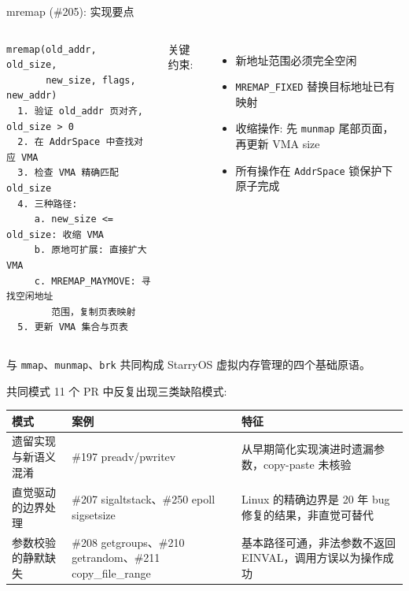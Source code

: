 \documentclass[aspectratio=169,10pt]{ctexbeamer}
\newcommand{\syscall}[1]{\texttt{#1}}
\begin{document}

\begin{frame}[fragile]{mremap (\#205): 实现要点}
\begin{columns}[T]
\small
\begin{verbatim}
mremap(old_addr, old_size,
       new_size, flags, new_addr)
  1. 验证 old_addr 页对齐, old_size > 0
  2. 在 AddrSpace 中查找对应 VMA
  3. 检查 VMA 精确匹配 old_size
  4. 三种路径:
     a. new_size <= old_size: 收缩 VMA
     b. 原地可扩展: 直接扩大 VMA
     c. MREMAP_MAYMOVE: 寻找空闲地址
        范围，复制页表映射
  5. 更新 VMA 集合与页表
\end{verbatim}

关键约束:
\begin{itemize}
  \item 新地址范围必须完全空闲
  \item \texttt{MREMAP\_FIXED} 替换目标地址已有映射
  \item 收缩操作: 先 \texttt{munmap} 尾部页面，再更新 VMA size
  \item 所有操作在 \texttt{AddrSpace} 锁保护下原子完成
\end{itemize}
\end{columns}

\vspace{1mm}
与 \syscall{mmap}、\syscall{munmap}、\syscall{brk} 共同构成 StarryOS 虚拟内存管理的四个基础原语。
\end{frame}


\begin{frame}{共同模式}
11 个 PR 中反复出现三类缺陷模式:

\vspace{1mm}
\begin{tabularx}{\textwidth}{p{3cm} p{3.5cm} X}
\toprule
\textbf{模式} & \textbf{案例} & \textbf{特征} \\
\midrule
\alert{遗留实现与新语义混淆}
  & \#197 preadv/pwritev
  & 从早期简化实现演进时遗漏参数，copy-paste 未核验 \\
\midrule
\alert{直觉驱动的边界处理}
  & \#207 sigaltstack、\#250 epoll sigsetsize
  & Linux 的精确边界是 20 年 bug 修复的结果，非直觉可替代 \\
\midrule
\alert{参数校验的静默缺失}
  & \#208 getgroups、\#210 getrandom、\#211 copy\_file\_range
  & 基本路径可通，非法参数不返回 EINVAL，调用方误以为操作成功 \\
\bottomrule
\end{tabularx}
\end{frame}
\end{document}
